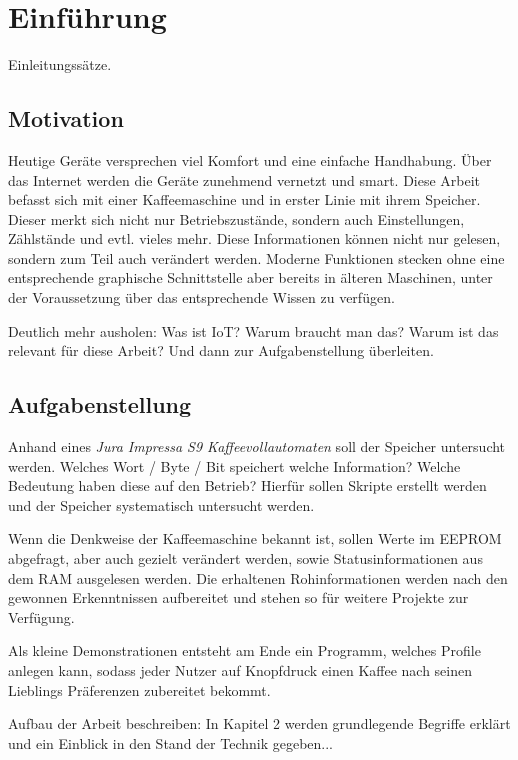 \chapter{Einführung}
\todo Einleitungssätze.

\section{Motivation}
Heutige Geräte versprechen viel Komfort und eine einfache Handhabung. Über das Internet werden die Geräte zunehmend vernetzt und smart.
Diese Arbeit befasst sich mit einer Kaffeemaschine und in erster Linie mit ihrem Speicher. Dieser merkt sich nicht nur Betriebszustände,
sondern auch Einstellungen, Zählstände und evtl. vieles mehr. Diese Informationen können nicht nur gelesen, sondern zum Teil auch verändert werden.
Moderne Funktionen stecken ohne eine entsprechende graphische Schnittstelle aber bereits in älteren Maschinen, unter der Voraussetzung über das entsprechende Wissen zu verfügen.

\todo Deutlich mehr ausholen: Was ist IoT? Warum braucht man das? Warum ist das relevant für diese Arbeit? Und dann zur Aufgabenstellung überleiten.

\section{Aufgabenstellung}
Anhand eines \textit{Jura Impressa S9 Kaffeevollautomaten} soll der Speicher untersucht werden.
Welches Wort / Byte / Bit speichert welche Information? Welche Bedeutung haben diese auf den Betrieb?
Hierfür sollen Skripte erstellt werden und der Speicher systematisch untersucht werden.

Wenn die Denkweise der Kaffeemaschine bekannt ist, sollen Werte im \ac{EEPROM} abgefragt, aber auch gezielt verändert werden, sowie Statusinformationen aus dem \ac{RAM} ausgelesen werden.
Die erhaltenen Rohinformationen werden nach den gewonnen Erkenntnissen aufbereitet und stehen so für weitere Projekte zur Verfügung.

Als kleine Demonstrationen entsteht am Ende ein Programm, welches Profile anlegen kann, sodass jeder Nutzer auf Knopfdruck einen Kaffee nach seinen Lieblings Präferenzen zubereitet bekommt.

\todo Aufbau der Arbeit beschreiben: In Kapitel 2 werden grundlegende Begriffe erklärt und ein Einblick in den Stand der Technik gegeben...
